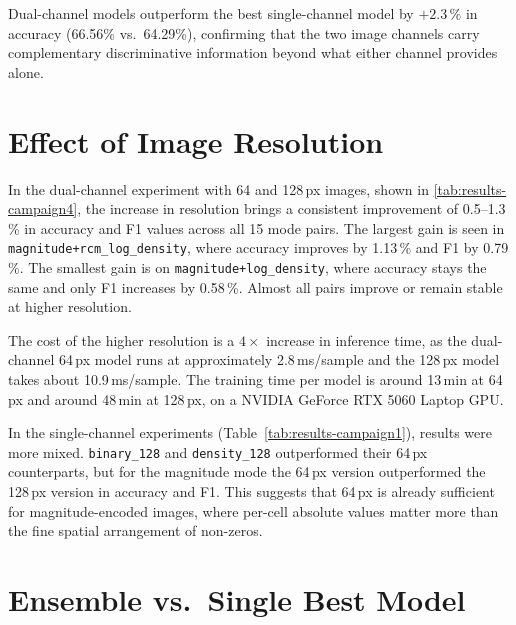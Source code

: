 Dual-channel models outperform the best single-channel model by $+2.3$\,\% in accuracy
(66.56\% vs.\ 64.29\%), confirming that the two image channels carry complementary
discriminative information beyond what either channel provides alone.

\section{Effect of Image Resolution}\label{sec:results-resolution}

In the dual-channel experiment with 64 and 128\,px images, shown in \autoref{tab:results-campaign4}, the increase in resolution
brings a consistent improvement of 0.5--1.3\,\% in accuracy and F1 values across all 15 mode pairs.
The largest gain is seen in \texttt{magnitude+rcm\_log\_density}, where accuracy improves by 1.13\,\% and F1 by 0.79\,\%.
The smallest gain is on \texttt{magnitude+log\_density}, where accuracy stays the same and only F1 increases by 0.58\,\%.
Almost all pairs improve or remain stable at higher resolution.

The cost of the higher resolution is a $4\times$ increase in inference time, as the dual-channel 64\,px model runs at approximately 2.8\,ms/sample and the
128\,px model takes about 10.9\,ms/sample.
The training time per model is around 13\,min at 64\,px and around 48\,min at 128\,px, on a NVIDIA GeForce RTX 5060 Laptop GPU.

In the single-channel experiments (Table~\ref{tab:results-campaign1}), results were more mixed.
\texttt{binary\_128} and \texttt{density\_128} outperformed their 64\,px counterparts, but for the magnitude mode the 64\,px version outperformed the 128\,px version in accuracy and F1.
This suggests that 64\,px is already sufficient for magnitude-encoded images, where per-cell absolute values matter more than the
fine spatial arrangement of non-zeros.

\section{Ensemble vs.\ Single Best Model}\label{sec:results-ensemble}

